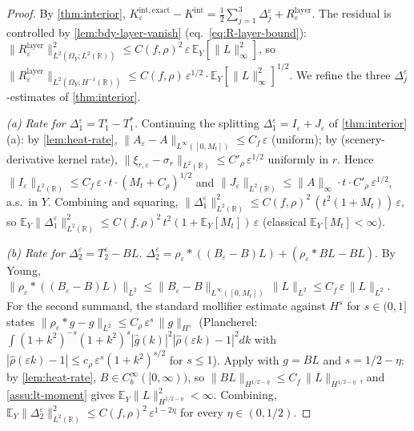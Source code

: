 \documentclass[11pt,reqno]{amsart}
\theoremstyle{plain}
\theoremstyle{definition}
\theoremstyle{remark}
\newcommand{\R}{\mathbb{R}}
\newcommand{\E}{\mathbb{E}}
\begin{document}
\begin{proof}
By \cref{thm:interior},
$K_{\varepsilon}^{\mathrm{int,exact}}-K^{\mathrm{int}}
=\tfrac12\sum_{j=1}^{3}\Delta_{j}^{\varepsilon}+R_{\varepsilon}^{\mathrm{layer}}$.
The residual is controlled by \cref{lem:bdy-layer-vanish}
(eq.~\eqref{eq:R-layer-bound}):
$\|R_{\varepsilon}^{\mathrm{layer}}\|_{L^{2}(\Omega_{Y};L^{2}(\R))}^{2}
\le C(f,\rho)^{2}\,\varepsilon\,\E_{Y}[\|L\|_{\infty}^{2}]$,
so $\|R_{\varepsilon}^{\mathrm{layer}}\|_{L^{2}(\Omega_{Y};H^{-1}(\R))}\le
C(f,\rho)\,\varepsilon^{1/2}\cdot\E_{Y}[\|L\|_{\infty}^{2}]^{1/2}$.
We refine the three $\Delta_{j}^{\varepsilon}$-estimates of
\cref{thm:interior}.

\smallskip\noindent\emph{(a) Rate for
$\Delta_{1}^{\varepsilon}=T_{1}^{\varepsilon}-T_{1}^{*}$.}
Continuing the splitting
$\Delta_{1}^{\varepsilon}=I_{\varepsilon}+J_{\varepsilon}$ of
\cref{thm:interior}(a): by \cref{lem:heat-rate},
$\|A_{\varepsilon}-A\|_{L^{\infty}([0,M_{t}])}\le C_{f}\,\varepsilon$
(uniform); by \cite{Fontes-EnergyFirst} (scenery-derivative kernel
rate), $\|\xi_{r,\varepsilon}-\sigma_{r}\|_{L^{2}(\R)}\le
C'_{\rho}\,\varepsilon^{1/2}$ uniformly in $r$. Hence
$\|I_{\varepsilon}\|_{L^{2}(\R)}\le C_{f}\,\varepsilon\cdot t\cdot(M_{t}+C_{\rho})^{1/2}$
and $\|J_{\varepsilon}\|_{L^{2}(\R)}\le\|A\|_{\infty}\cdot t\cdot C'_{\rho}\,\varepsilon^{1/2}$,
a.s.\ in $Y$. Combining and squaring,
$\|\Delta_{1}^{\varepsilon}\|_{L^{2}(\R)}^{2}\le
C(f,\rho)^{2}\,(t^{2}(1+M_{t}))\,\varepsilon$, so
$\E_{Y}\|\Delta_{1}^{\varepsilon}\|_{L^{2}(\R)}^{2}\le
C(f,\rho)^{2}\,t^{2}(1+\E_{Y}[M_{t}])\,\varepsilon$ (classical
$\E_{Y}[M_{t}]<\infty$).

\smallskip\noindent\emph{(b) Rate for
$\Delta_{2}^{\varepsilon}=T_{2}^{\varepsilon}-BL$.}
$\Delta_{2}^{\varepsilon}=\rho_{\varepsilon}*((B_{\varepsilon}-B)L)
+(\rho_{\varepsilon}*BL-BL)$. By Young,
$\|\rho_{\varepsilon}*((B_{\varepsilon}-B)L)\|_{L^{2}}\le
\|B_{\varepsilon}-B\|_{L^{\infty}([0,M_{t}])}\,\|L\|_{L^{2}}\le C_{f}\,\varepsilon\,\|L\|_{L^{2}}$.
For the second summand, the standard mollifier estimate against
$H^{s}$ for $s\in(0,1]$ states
$\|\rho_{\varepsilon}*g-g\|_{L^{2}}\le C_{\rho}\,\varepsilon^{s}\,\|g\|_{H^{s}}$
(Plancherel: $\int(1+k^{2})^{-s}(1+k^{2})^{s}|\hat g(k)|^{2}|\hat\rho(\varepsilon k)-1|^{2}dk$
with $|\hat\rho(\varepsilon k)-1|\le c_{\rho}\,\varepsilon^{s}(1+k^{2})^{s/2}$
for $s\le 1$). Apply with $g=BL$ and $s=1/2-\eta$: by
\cref{lem:heat-rate}, $B\in C_{b}^{\infty}([0,\infty))$, so
$\|BL\|_{H^{1/2-\eta}}\le C_{f}\,\|L\|_{H^{1/2-\eta}}$, and
\cref{assu:lt-moment} gives
$\E_{Y}\|L\|_{H^{1/2-\eta}}^{2}<\infty$. Combining,
$\E_{Y}\|\Delta_{2}^{\varepsilon}\|_{L^{2}(\R)}^{2}\le
C(f,\rho)^{2}\,\varepsilon^{1-2\eta}$ for every $\eta\in(0,1/2)$.


\end{proof}
\end{document}
